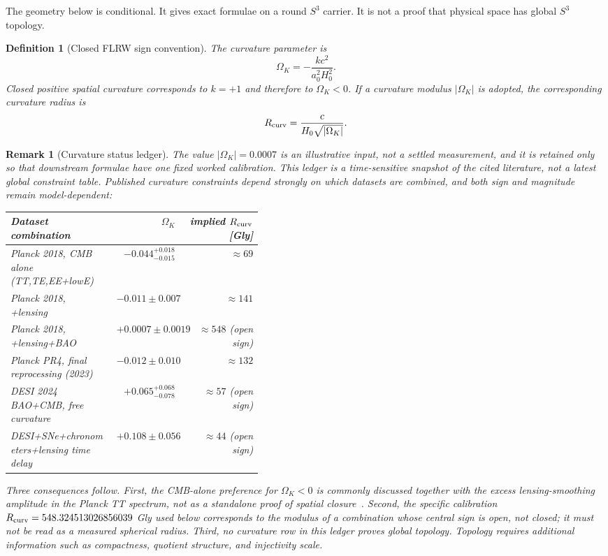 \documentclass[11pt,a4paper]{article}
\newtheorem{definition}[theorem]{Definition}
\newtheorem{remark}[theorem]{Remark}
\begin{document}
The geometry below is conditional.  It gives exact formulae on a round $S^3$ carrier.  It is not a proof that physical space has global $S^3$ topology.

\begin{definition}[Closed FLRW sign convention]
The curvature parameter is
\[
\Omega_K=-\frac{k c^2}{a_0^2H_0^2}.
\]
Closed positive spatial curvature corresponds to $k=+1$ and therefore to $\Omega_K<0$.  If a curvature modulus $|\Omega_K|$ is adopted, the corresponding curvature radius is
\[
R_{\rm curv}=\frac{c}{H_0\sqrt{|\Omega_K|}}.
\]
\end{definition}

\begin{remark}[Curvature status ledger]
\label{rem:curvature-status}
The value $|\Omega_K|=0.0007$ is an illustrative input, not a settled measurement, and it is retained only so that downstream formulae have one fixed worked calibration.  This ledger is a time-sensitive snapshot of the cited literature, not a latest global constraint table.  Published curvature constraints depend strongly on which datasets are combined, and both sign and magnitude remain model-dependent:
\begin{center}
\small
\begin{tabular}{p{0.42\linewidth}rr}
\toprule
Dataset combination & $\Omega_K$ & implied $R_{\rm curv}$ [Gly]\\
\midrule
Planck 2018, CMB alone (TT,TE,EE+lowE)~\cite{Planck2018VI,DiValentino2019} & $-0.044^{+0.018}_{-0.015}$ & $\approx69$\\
Planck 2018, +lensing~\cite{Planck2018VI} & $-0.011\pm0.007$ & $\approx141$\\
Planck 2018, +lensing+BAO~\cite{Planck2018VI} & $+0.0007\pm0.0019$ & $\approx548$ (open sign)\\
Planck PR4, final reprocessing (2023)~\cite{TristramPR4} & $-0.012\pm0.010$ & $\approx132$\\
DESI 2024 BAO+CMB, free curvature~\cite{DESI2024VI} & $+0.065^{+0.068}_{-0.078}$ & $\approx57$ (open sign)\\
DESI+SNe+chronometers+lensing time delay~\cite{Zhai2024} & $+0.108\pm0.056$ & $\approx44$ (open sign)\\
\bottomrule
\end{tabular}
\end{center}
Three consequences follow. First, the CMB-alone preference for $\Omega_K<0$ is commonly discussed together with the excess lensing-smoothing amplitude in the Planck TT spectrum, not as a standalone proof of spatial closure~\cite{EfstathiouGratton2020,Handley2021}.  Second, the specific calibration $R_{\rm curv}=548.324513026856039$ Gly used below corresponds to the modulus of a combination whose central sign is open, not closed; it must not be read as a measured spherical radius.  Third, no curvature row in this ledger proves global topology.  Topology requires additional information such as compactness, quotient structure, and injectivity scale.
\end{remark}
\end{document}
